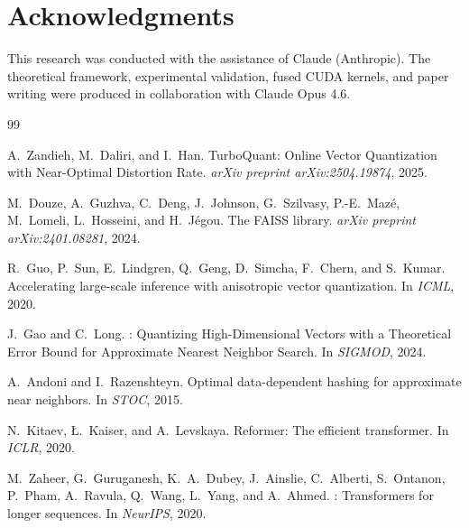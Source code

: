 \documentclass[10pt,twocolumn]{article}
\theoremstyle{definition}
\begin{document}
\section*{Acknowledgments}

This research was conducted with the assistance of Claude (Anthropic).
The theoretical framework, experimental validation, fused CUDA kernels,
and paper writing were produced in collaboration with Claude Opus 4.6.


\begin{thebibliography}{99}

A.~Zandieh, M.~Daliri, and I.~Han.
\newblock TurboQuant: Online Vector Quantization with Near-Optimal Distortion
  Rate.
\newblock \emph{arXiv preprint arXiv:2504.19874}, 2025.

M.~Douze, A.~Guzhva, C.~Deng, J.~Johnson, G.~Szilvasy, P.-E.~Maz\'{e},
  M.~Lomeli, L.~Hosseini, and H.~J\'{e}gou.
\newblock The {FAISS} library.
\newblock \emph{arXiv preprint arXiv:2401.08281}, 2024.

R.~Guo, P.~Sun, E.~Lindgren, Q.~Geng, D.~Simcha, F.~Chern, and S.~Kumar.
\newblock Accelerating large-scale inference with anisotropic vector
  quantization.
\newblock In \emph{ICML}, 2020.

J.~Gao and C.~Long.
: Quantizing High-Dimensional Vectors with a Theoretical
  Error Bound for Approximate Nearest Neighbor Search.
\newblock In \emph{SIGMOD}, 2024.

A.~Andoni and I.~Razenshteyn.
\newblock Optimal data-dependent hashing for approximate near neighbors.
\newblock In \emph{STOC}, 2015.

N.~Kitaev, {\L}.~Kaiser, and A.~Levskaya.
\newblock Reformer: The efficient transformer.
\newblock In \emph{ICLR}, 2020.

M.~Zaheer, G.~Guruganesh, K.~A.~Dubey, J.~Ainslie, C.~Alberti, S.~Ontanon,
  P.~Pham, A.~Ravula, Q.~Wang, L.~Yang, and A.~Ahmed.
: Transformers for longer sequences.
\newblock In \emph{NeurIPS}, 2020.


\end{thebibliography}
\end{document}
